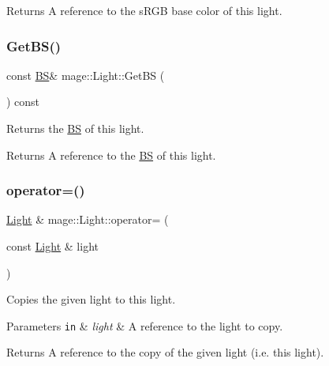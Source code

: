 \begin{DoxyReturn}{Returns}
A reference to the s\+R\+GB base color of this light. 
\end{DoxyReturn}
\hypertarget{classmage_1_1_light_ab2365a76f8f3a2ae2c97263ea556a993}{}\label{classmage_1_1_light_ab2365a76f8f3a2ae2c97263ea556a993} 
\subsubsection{\texorpdfstring{Get\+B\+S()}{GetBS()}}
{\footnotesize\ttfamily const \hyperlink{structmage_1_1_b_s}{BS}\& mage\+::\+Light\+::\+Get\+BS (\begin{DoxyParamCaption}{ }\end{DoxyParamCaption}) const\hspace{0.3cm}{\ttfamily [noexcept]}}

Returns the \hyperlink{structmage_1_1_b_s}{BS} of this light.

\begin{DoxyReturn}{Returns}
A reference to the \hyperlink{structmage_1_1_b_s}{BS} of this light. 
\end{DoxyReturn}
\hypertarget{classmage_1_1_light_ad1267c8d162e2cdead5e3a7d83cef3c1}{}\label{classmage_1_1_light_ad1267c8d162e2cdead5e3a7d83cef3c1} 
\subsubsection{\texorpdfstring{operator=()}{operator=()}\hspace{0.1cm}{\footnotesize\ttfamily [1/2]}}
{\footnotesize\ttfamily \hyperlink{classmage_1_1_light}{Light} \& mage\+::\+Light\+::operator= (\begin{DoxyParamCaption}\item[{const \hyperlink{classmage_1_1_light}{Light} \&}]{light }\end{DoxyParamCaption})\hspace{0.3cm}{\ttfamily [default]}}

Copies the given light to this light.


\begin{DoxyParams}[1]{Parameters}
\mbox{\tt in}  & {\em light} & A reference to the light to copy. \\
\hline
\end{DoxyParams}
\begin{DoxyReturn}{Returns}
A reference to the copy of the given light (i.\+e. this light). 
\end{DoxyReturn}
\hypertarget{classmage_1_1_light_a5fd2edc3fcbcc1dbe7a2620b76cedd25}{}\label{classmage_1_1_light_a5fd2edc3fcbcc1dbe7a2620b76cedd25} 
